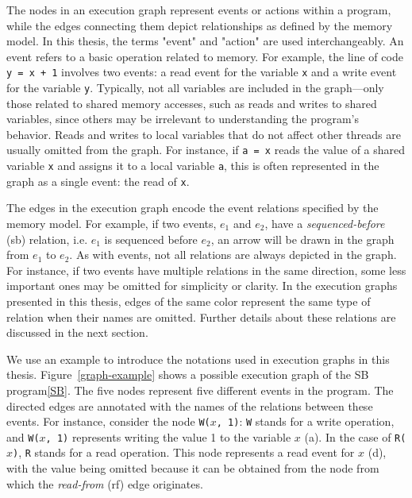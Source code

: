 The nodes in an execution graph represent events or actions within a program, while the edges connecting them depict relationships as defined by the memory model. In this thesis, the terms "event" and "action" are used interchangeably. An event refers to a basic operation related to memory. For example, the line of code \texttt{y = x + 1} involves two events: a read event for the variable \texttt{x} and a write event for the variable \texttt{y}. Typically, not all variables are included in the graph—only those related to shared memory accesses, such as reads and writes to shared variables, since others may be irrelevant to understanding the program's behavior. Reads and writes to local variables that do not affect other threads are usually omitted from the graph. For instance, if \texttt{a = x} reads the value of a shared variable \texttt{x} and assigns it to a local variable \texttt{a}, this is often represented in the graph as a single event: the read of \texttt{x}.

The edges in the execution graph encode the event relations specified by the memory model. For example, if two events, $e_1$ and $e_2$, have a \textit{sequenced-before} (sb) relation, i.e. $e_1$ is sequenced before $e_2$, an arrow will be drawn in the graph from $e_1$ to $e_2$. As with events, not all relations are always depicted in the graph. For instance, if two events have multiple relations in the same direction, some less important ones may be omitted for simplicity or clarity. In the execution graphs presented in this thesis, edges of the same color represent the same type of relation when their names are omitted. Further details about these relations are discussed in the next section.





We use an example to introduce the notations used in execution graphs in this thesis. Figure~\ref{graph-example} shows a possible execution graph of the SB program\ref{SB}. The five nodes represent five different events in the program. The directed edges are annotated with the names of the relations between these events. For instance, consider the node \texttt{W($x$, 1)}: \texttt{W} stands for a write operation, and \texttt{W($x$, 1)} represents writing the value 1 to the variable \texttt{$x$} (a). In the case of \texttt{R($x$)}, \texttt{R} stands for a read operation. This node represents a read event for \texttt{$x$} (d), with the value being omitted because it can be obtained from the node from which the \textit{read-from} (rf) edge originates.

